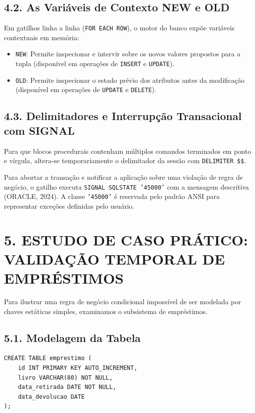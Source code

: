 \subsection*{4.2. As Variáveis de Contexto NEW e OLD}

Em gatilhos linha a linha (\texttt{FOR EACH ROW}), o motor do banco expõe variáveis contextuais em memória:
\begin{itemize}
    \item \texttt{NEW}: Permite inspecionar e intervir sobre os novos valores propostos para a tupla (disponível em operações de \texttt{INSERT} e \texttt{UPDATE}).
    \item \texttt{OLD}: Permite inspecionar o estado prévio dos atributos antes da modificação (disponível em operações de \texttt{UPDATE} e \texttt{DELETE}).
\end{itemize}

\subsection*{4.3. Delimitadores e Interrupção Transacional com SIGNAL}

Para que blocos procedurais contenham múltiplos comandos terminados em ponto e vírgula, altera-se temporariamente o delimitador da sessão com \texttt{DELIMITER \$\$}. 

Para abortar a transação e notificar a aplicação sobre uma violação de regra de negócio, o gatilho executa \texttt{SIGNAL SQLSTATE '45000'} com a mensagem descritiva (ORACLE, 2024). A classe \texttt{'45000'} é reservada pelo padrão ANSI para representar exceções definidas pelo usuário.

\newpage

\section*{5. ESTUDO DE CASO PRÁTICO: VALIDAÇÃO TEMPORAL DE EMPRÉSTIMOS}

Para ilustrar uma regra de negócio condicional impossível de ser modelada por chaves estáticas simples, examinamos o subsistema de empréstimos.

\subsection*{5.1. Modelagem da Tabela}

\begin{lstlisting}
CREATE TABLE emprestimo (
    id INT PRIMARY KEY AUTO_INCREMENT,
    livro VARCHAR(80) NOT NULL,
    data_retirada DATE NOT NULL,
    data_devolucao DATE
);
\end{lstlisting}

